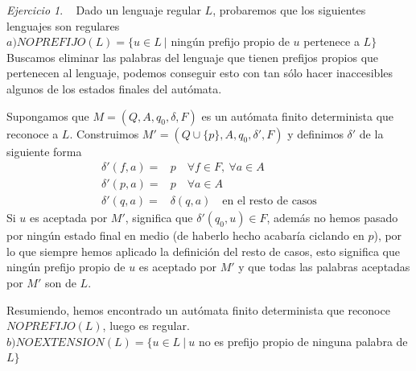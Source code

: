 \documentclass[12pt,spanish]{article}
\theoremstyle{definition}
\theoremstyle{remark}
\newtheorem{exercise}{Ejercicio}%
\begin{document}
\begin{exercise}~ Dado un lenguaje regular $L$, probaremos que los
  siguientes lenguajes son regulares \\
  
  $a) NOPREFIJO(L)=\{u\in L \ |$ ningún prefijo propio de $u$ pertenece a $L\}$ \\

  Buscamos eliminar las palabras del lenguaje que tienen prefijos
  propios que pertenecen al lenguaje, podemos conseguir esto con tan
  sólo hacer inaccesibles algunos de los estados finales del autómata.

  Supongamos que $M=(Q,A,q_0,\delta,F)$ es un autómata finito
  determinista que reconoce a $L$. Construimos
  $M'=(Q\cup\{p\},A,q_0,\delta',F)$ y definimos $\delta'$ de la
  siguiente forma
  \begin{align*}
    \delta'(f,a)=&p \quad \forall f \in F, \ \forall a \in A \\
    \delta'(p,a)=&p \quad \forall a \in A \\
    \delta'(q,a)=&\delta(q,a) \quad \text{en el resto de casos}
  \end{align*}
  Si $u$ es aceptada por $M'$, significa que $\delta'(q_0,u) \in F$,
  además no hemos pasado por ningún estado final en medio (de haberlo
  hecho acabaría ciclando en $p$), por lo que siempre hemos aplicado
  la definición del resto de casos, esto significa que ningún prefijo
  propio de $u$ es aceptado por $M'$ y que todas las palabras
  aceptadas por $M'$ son de $L$.

  Resumiendo, hemos encontrado un autómata finito determinista que
  reconoce $NOPREFIJO(L)$, luego es regular. \\

  $b) NOEXTENSION(L)=\{u\in L \ | \ u$ no es prefijo propio de ninguna
  palabra de $L\}$ \\  

  
\end{exercise} 
\end{document}
